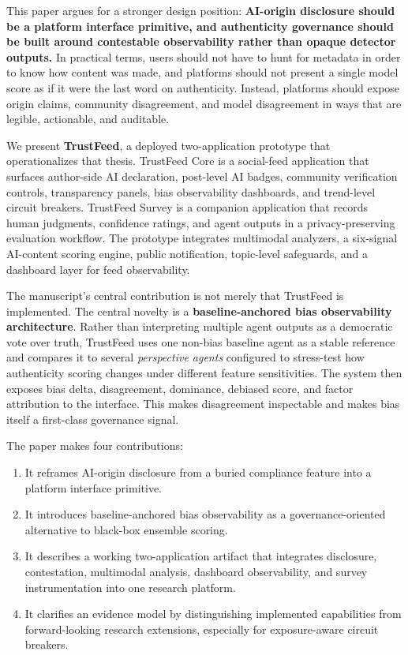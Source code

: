 \documentclass[acmlarge,screen,nonacm]{acmart}
\begin{document}
This paper argues for a stronger design position: \textbf{AI-origin disclosure should be a platform interface primitive, and authenticity governance should be built around contestable observability rather than opaque detector outputs.} In practical terms, users should not have to hunt for metadata in order to know how content was made, and platforms should not present a single model score as if it were the last word on authenticity. Instead, platforms should expose origin claims, community disagreement, and model disagreement in ways that are legible, actionable, and auditable.

We present \textbf{TrustFeed}, a deployed two-application prototype that operationalizes that thesis. TrustFeed Core is a social-feed application that surfaces author-side AI declaration, post-level AI badges, community verification controls, transparency panels, bias observability dashboards, and trend-level circuit breakers. TrustFeed Survey is a companion application that records human judgments, confidence ratings, and agent outputs in a privacy-preserving evaluation workflow. The prototype integrates multimodal analyzers, a six-signal AI-content scoring engine, public notification, topic-level safeguards, and a dashboard layer for feed observability.

The manuscript's central contribution is not merely that TrustFeed is implemented. The central novelty is a \textbf{baseline-anchored bias observability architecture}. Rather than interpreting multiple agent outputs as a democratic vote over truth, TrustFeed uses one non-bias baseline agent as a stable reference and compares it to several \emph{perspective agents} configured to stress-test how authenticity scoring changes under different feature sensitivities. The system then exposes bias delta, disagreement, dominance, debiased score, and factor attribution to the interface. This makes disagreement inspectable and makes bias itself a first-class governance signal.

The paper makes four contributions:
\begin{enumerate}[leftmargin=1.5em]
    \item It reframes AI-origin disclosure from a buried compliance feature into a platform interface primitive.
    \item It introduces baseline-anchored bias observability as a governance-oriented alternative to black-box ensemble scoring.
    \item It describes a working two-application artifact that integrates disclosure, contestation, multimodal analysis, dashboard observability, and survey instrumentation into one research platform.
    \item It clarifies an evidence model by distinguishing implemented capabilities from forward-looking research extensions, especially for exposure-aware circuit breakers.
\end{enumerate}
\end{document}

